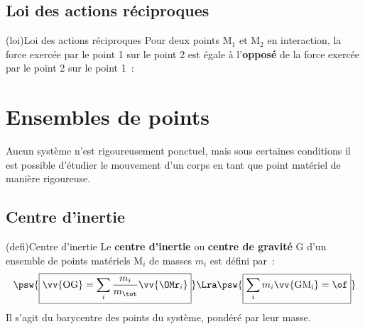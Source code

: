 \documentclass[../../main/main.tex]{subfiles}
\begin{document}
\subsection{Loi des actions réciproques}

\begin{tcb*}[sidebyside](loi){Loi des actions réciproques}
	Pour deux points M$_1$ et M$_2$ en interaction, la force exercée par le point
	1 sur le point 2 est égale à l'\textbf{opposé} de la force exercée par le
	point 2 sur le point 1~:
	\psw{%
		\[\boxed{\Ff_{1\ra2} = - \Ff_{2\ra1}}\]
	}%
	\vspace{-15pt}
	\tcblower
	\begin{center}
		\vspace{-15pt}
	\end{center}
\end{tcb*}

\section{Ensembles de points}
Aucun système n'est rigoureusement ponctuel, mais sous certaines conditions il
est possible d'étudier le mouvement d'un corps en tant que point matériel de
manière rigoureuse.

\subsection{Centre d'inertie}

\begin{tcb*}(defi){Centre d'inertie}
	Le \textbf{centre d'inertie} ou \textbf{centre de gravité} G d'un ensemble
	de points matériels M$_i$ de masses $m_i$ est défini par~:
	\[
		\psw{%
			\boxed{\vv{\rm OG} = \sum_i \frac{m_i}{m_{\tot}} \vv{{\OMr}_i}}
		}
		\Lra
		\psw{%
			\boxed{\sum_i m_i \vv{\rm GM_i} = \of }
		}
	\]
	Il s'agit du barycentre des points du système, pondéré par leur masse.
\end{tcb*}
\end{document}
